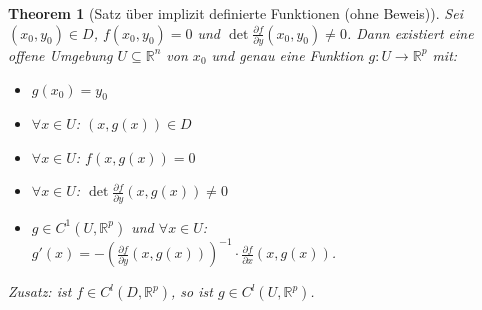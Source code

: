 \documentclass[12pt]{extreport} %
\newcommand{\R}{\mathbb{R}}
\theoremstyle{named}
\newtheorem{unnamedtheorem}{Theorem} \counterwithin{unnamedtheorem}{chapter}
\theoremstyle{nnamed}
\theoremstyle{itshape}
\theoremstyle{normal}
\begin{document}
\begin{unnamedtheorem}[Satz über implizit definierte Funktionen (ohne Beweis)] \label{19.5:satz}
	Sei $(x_{0}, y_{0}) \in D$, $f(x_{0}, y_{0}) = 0$ und $\det \frac{\partial f}{\partial y}(x_{0}, y_{0}) \neq 0$. Dann existiert eine offene Umgebung $U \subseteq \R^{n}$ von $x_{0}$ und genau eine Funktion $g \colon U \rightarrow \R^{p}$ mit:
	\begin{itemize}
		\item $g(x_{0}) = y_{0}$
		\item $\forall x \in U$: $(x, g(x)) \in D$
		\item $\forall x \in U$: $f(x, g(x)) = 0$ 
		\item $\forall x \in U$: $\det \frac{\partial f}{\partial y}(x, g(x)) \neq 0$
		\item $g \in C^{1}(U, \R^{p})$ und $\forall x \in U$: $g'(x) = - \left( \frac{\partial f}{\partial y}(x, g(x))\right)^{-1} \cdot \frac{\partial f}{\partial x}(x, g(x))$.
	\end{itemize}
	Zusatz: ist $f \in C^{l}(D, \R^{p})$, so ist $g \in C^{l}(U, \R^{p})$.
\end{unnamedtheorem}
\end{document}
